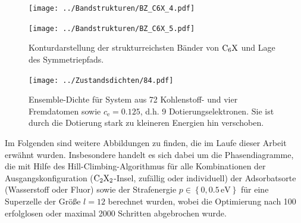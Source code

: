 \documentclass[a4paper, 10pt, twoside, openany]{book} %
\newcommand \braces[1]{\left \lbrace #1 \right \rbrace}
\def \cE {c_\mathrm{e}}
\begin{document}
	\begin{figure}
		\begin{minipage}[t]{0.48\textwidth}
			\texttt{[image: ../Bandstrukturen/BZ\_C6X\_4.pdf]}
		\end{minipage}
		\hfill
		\begin{minipage}[t]{0.48\textwidth}
			\texttt{[image: ../Bandstrukturen/BZ\_C6X\_5.pdf]}
		\end{minipage}
		\caption[Konturdarstellung der Dispersionsrelation von $\rm C_6X$]{Konturdarstellung der strukturreichsten Bänder von $\rm C_6X$ und Lage des Symmetriepfads.}
		\label{C6X Kontur}
	\end{figure}
	\begin{figure}
		\texttt{[image: ../Zustandsdichten/84.pdf]}
		\caption[Ensemble-Dichte mit Dotierung]{Ensemble-Dichte für System aus 72 Kohlenstoff- und vier Fremdatomen sowie $\cE = 0.125$, d.h. 9 Dotierungselektronen. Sie ist durch die Dotierung stark zu kleineren Energien hin verschoben.}
		\label{Phasenvolumen2}
	\end{figure}
	Im Folgenden sind weitere Abbildungen zu finden, die im Laufe dieser Arbeit erwähnt wurden. Insbesondere handelt es sich dabei um die Phasendiagramme, die mit Hilfe des Hill-Climbing-Algorithmus für alle Kombinationen der Ausgangskonfiguration ($\rm C_2X_2$-Insel, zufällig oder individuell) der Adsorbatsorte (Wasserstoff oder Fluor) sowie der Strafenergie $p \in \braces{0, 0.5\,\mathrm{eV}}$ für eine Superzelle der Größe $l = 12$ berechnet wurden, wobei die Optimierung nach 100 erfolglosen oder maximal 2000 Schritten abgebrochen wurde.
	
\end{document}
